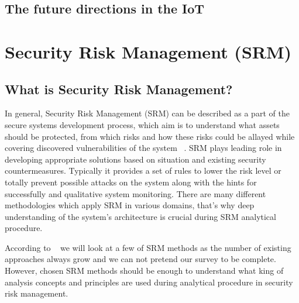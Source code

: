 \documentclass[12pt]{article}
\begin{document}
\subsection{The future directions in the IoT}



\newpage
\section{Security Risk Management (SRM) } 

\subsection{What is Security Risk Management? }

In general, Security Risk Management  (SRM) can be described as a part of the secure systems development process, which aim is to understand what assets should be protected, from which risks and how these risks could be allayed while covering discovered vulnerabilities of the system  ~\cite{FSSM}. SRM  plays leading role in developing appropriate solutions based on situation and existing security countermeasures. Typically it provides a set of rules to lower the risk level or totally prevent possible attacks on the system along with the hints for successfully and qualitative system monitoring. There are many different methodologies which apply SRM in various domains, that's why deep understanding of the system's architecture is crucial during SRM analytical procedure.

According to ~\cite{FSSM} we will look at a few of SRM methods as the number of existing approaches always grow and we can not pretend our survey to be complete. However, chosen SRM methods should  be enough to understand what king of analysis concepts and principles are used during analytical procedure in security risk management.
\end{document}
